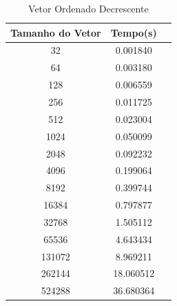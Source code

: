 \documentclass[12pt,a4paper,twoside]{report}
\begin{document}
\begin{table}[h]
  \centering
  \caption{Vetor Ordenado Decrescente \label{tab:od}}
  \begin{tabular}{ccc} \\\hline
  \textbf{Tamanho do Vetor}  & \textbf{Tempo(s)} \\\hline
  32                              & 0.001840          \\\hline
  64                              & 0.003180          \\\hline
  128                             & 0.006559          \\\hline
  256                             & 0.011725          \\\hline
  512                             & 0.023004          \\\hline
  1024                            & 0.050099          \\\hline
  2048                            & 0.092232          \\\hline
  4096                            & 0.199064         \\\hline
  8192                            & 0.399744         \\\hline
  16384                           & 0.797877
  \\\hline
  32768                           & 1.505112         \\\hline
  65536                           & 4.643434         \\\hline
  131072                          & 8.969211         \\\hline
  262144                          & 18.060512         \\\hline
  524288                          & 36.680364        \\\hline
  \end{tabular}
\end{table}
\end{document}
